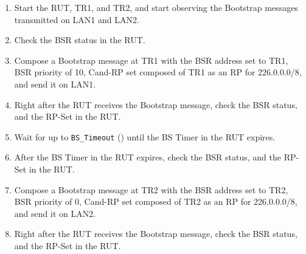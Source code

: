 \documentclass[11pt]{report}
\begin{document}
\begin{enumerate}

  \item Start the RUT, TR1, and TR2, and start observing the Bootstrap messages
  transmitted on LAN1 and LAN2.

  \item Check the BSR status in the RUT.

  \item Compose a Bootstrap message at TR1 with the BSR address set to TR1,
  BSR priority of 10, Cand-RP set composed of TR1 as an RP for 226.0.0.0/8,
  and send it on LAN1.

  \item Right after the RUT receives the Bootstrap message, check the BSR
  status, and the RP-Set in the RUT.

  \item Wait for up to \verb=BS_Timeout= ({\PimsmBSTimeout}) until the BS
  Timer in the RUT expires.

  \item After the BS Timer in the RUT expires, check the BSR status, and the
  RP-Set in the RUT.

  \item Compose a Bootstrap message at TR2 with the BSR address set to TR2,
  BSR priority of 0, Cand-RP set composed of TR2 as an RP for 226.0.0.0/8,
  and send it on LAN2.

  \item Right after the RUT receives the Bootstrap message, check the BSR
  status, and the RP-Set in the RUT.

\end{enumerate}

\end{document}
